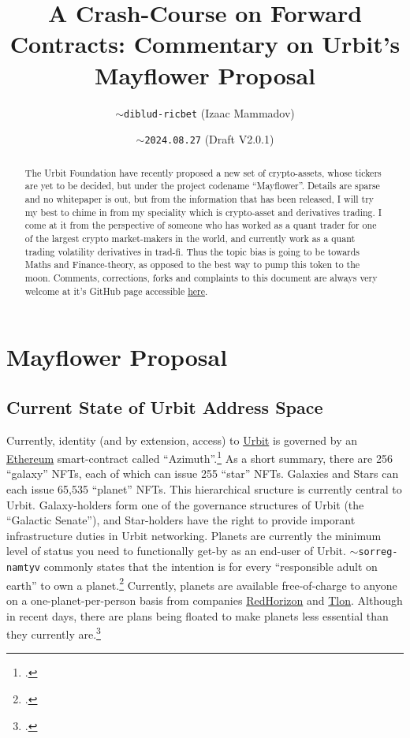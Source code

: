 \documentclass{article}
\begin{document}
	\title{A Crash-Course on Forward Contracts: Commentary on Urbit's Mayflower Proposal}
	\author{\texttt{$\sim$diblud-ricbet} (Izaac Mammadov)}
	\date{\texttt{$\sim$2024.08.27} (Draft V2.0.1)}
	\maketitle
	
	\begin{abstract}
		The Urbit Foundation have recently proposed a new set of crypto-assets, whose tickers are yet to be decided, but under the project codename ``Mayflower''. Details are sparse and no whitepaper is out, but from the information that has been released, I will try my best to chime in from my speciality which is crypto-asset and derivatives trading. I come at it from the perspective of someone who has worked as a quant trader for one of the largest crypto market-makers in the world, and currently work as a quant trading volatility derivatives in trad-fi. Thus the topic bias is going to be towards Maths and Finance-theory, as opposed to the best way to pump this token to the moon. Comments, corrections, forks and complaints to this document are always very welcome at it's GitHub page accessible \href{https://github.com/IzaacMammadov/forwards-for-urbiters}{here}.
	\end{abstract}
	
	\tableofcontents
	
	\section{Mayflower Proposal}
	\subsection{Current State of Urbit Address Space}
	Currently, identity (and by extension, access) to \href{https://urbit.org/}{Urbit} is governed by an \href{https://ethereum.org/en/}{Ethereum} smart-contract called ``Azimuth''.\footcite{azimuth} As a short summary, there are 256 ``galaxy'' NFTs, each of which can issue 255 ``star'' NFTs. Galaxies and Stars can each issue 65,535 ``planet'' NFTs. This hierarchical sructure is currently central to Urbit. Galaxy-holders form one of the governance structures of Urbit (the ``Galactic Senate''), and Star-holders have the right to provide imporant infrastructure duties in Urbit networking. Planets are currently the minimum level of status  you need to functionally get-by as an end-user of Urbit. \texttt{$\sim$sorreg-namtyv} commonly states that the intention is for every ``responsible adult on earth'' to own a planet.\footcite{curtis-tweet} Currently, planets are available free-of-charge to anyone on a one-planet-per-person basis from companies \href{https://redhorizon.com/}{RedHorizon} and \href{https://tlon.io/}{Tlon}. Although in recent days, there are plans being floated to make planets less essential than they currently are.\footcite{groundwire}
	
\end{document}
